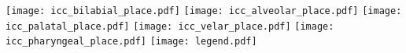 \documentclass[varwidth=7in]{standalone}
\begin{document}
\raggedright

\texttt{[image: icc\_bilabial\_place.pdf]}%
\texttt{[image: icc\_alveolar\_place.pdf]}%
\texttt{[image: icc\_palatal\_place.pdf]}%
\texttt{[image: icc\_velar\_place.pdf]}%
\texttt{[image: icc\_pharyngeal\_place.pdf]}%
\texttt{[image: legend.pdf]}
\end{document}
